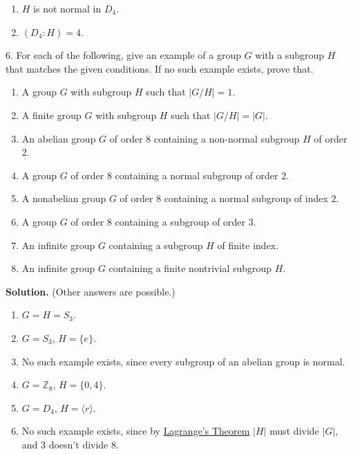 \documentclass[10pt,]{book}
\theoremstyle{plain}
\theoremstyle{definition}
\theoremstyle{definition}
\theoremstyle{definition}
\theoremstyle{definition}
\numberwithin{equation}{section}
\def\Z{\mathbb{Z}}
\begin{document}
\begin{exerciselist}
\begin{enumerate}[label=(\alph*)]
\begin{enumerate}[label=\roman*.]
\item\hypertarget{li-449}{}\(H\) is not normal in \(D_4\).%
\item\hypertarget{li-450}{}\((D_4:H)=4\).%
\end{enumerate}
%
\end{enumerate}
%
\item[6.]\hypertarget{exercise-55}{}For each of the following, give an example of a group \(G\) with a subgroup \(H\) that matches the given conditions. If no such example exists, prove that. \leavevmode%
\begin{enumerate}[label=(\alph*)]
\item\hypertarget{li-451}{}A group \(G\) with subgroup \(H\) such that \(|G/H|=1\).%
\item\hypertarget{li-452}{}A finite group \(G\) with subgroup \(H\) such that \(|G/H|=|G|\).%
\item\hypertarget{li-453}{}An abelian group \(G\) of order \(8\) containing a non-normal subgroup \(H\) of order 2.%
\item\hypertarget{li-454}{}A group \(G\) of order 8 containing a normal subgroup of order \(2\).%
\item\hypertarget{li-455}{}A nonabelian group \(G\) of order 8 containing a normal subgroup of index \(2\).%
\item\hypertarget{li-456}{}A group \(G\) of order 8 containing a subgroup of order \(3\).%
\item\hypertarget{li-457}{}An infinite group \(G\) containing a subgroup \(H\) of finite index.%
\item\hypertarget{li-458}{}An infinite group \(G\) containing a finite nontrivial subgroup \(H\).%
\end{enumerate}
%
\par\smallskip
\par\smallskip
\noindent\textbf{Solution.}\hypertarget{solution-55}{}\quad
(Other answers are possible.) \leavevmode%
\begin{enumerate}[label=(\alph*)]
\item\hypertarget{li-459}{}\(G=H=S_3\).%
\item\hypertarget{li-460}{}\(G=S_3\), \(H=\{e\}\).%
\item\hypertarget{li-461}{}No such example exists, since every subgroup of an abelian group is normal.%
\item\hypertarget{li-462}{}\(G=\Z_8\), \(H=\{0,4\}\).%
\item\hypertarget{li-463}{}\(G=D_4\), \(H=\langle r\rangle\).%
\item\hypertarget{li-464}{}No such example exists, since by \hyperref[lagrange]{Lagrange's Theorem} \(|H|\) must divide \(|G|\), and 3 doesn't divide 8.%

\end{enumerate}
\end{exerciselist}
\end{document}
